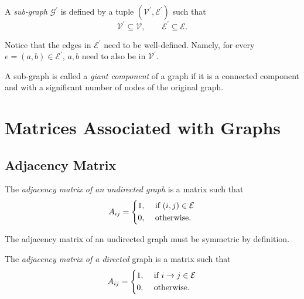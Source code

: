 \begin{definition}
	A \emph{sub-graph} \(\mathcal{G}^\prime\) is defined by a tuple \((\mathcal{V}^\prime, \mathcal{E}^\prime)\) such that
	\[
		\mathcal{V}^\prime \subseteq \mathcal{V}, \qquad \mathcal{E}^\prime\subseteq\mathcal{E}.
	\]
\end{definition}
\begin{note}
	Notice that the edges in \(\mathcal{E}^\prime\) need to be well-defined. Namely, for every
	\(e = (a,b) \in\mathcal{E}^\prime\), \(a, b\) need to also be in \(\mathcal{V}^\prime\).
\end{note}

\begin{definition}
	A sub-graph is called a \emph{giant component} of a graph if it is a connected component and with a significant number of nodes of the original graph.
\end{definition}

\section{Matrices Associated with Graphs}
\subsection{Adjacency Matrix}
\begin{definition}
	The \emph{adjacency matrix of an undirected graph} is a matrix such that
	\[
		A_{ij} =\begin{dcases}
			1, & \text{ if }(i, j)\in\mathcal{E} \\
			0, & \text{ otherwise.}
		\end{dcases}
	\]
\end{definition}
\begin{remark}
	The adjacency matrix of an undirected graph must be symmetric by definition.
\end{remark}

\begin{definition}
	The \emph{adjacency matrix of a directed} graph is a matrix such that
	\[
		A_{ij} = \begin{dcases}
			1, & \text{ if }i\to j\in\mathcal{E} \\
			0, & \text{ otherwise.}
		\end{dcases}
	\]
\end{definition}
